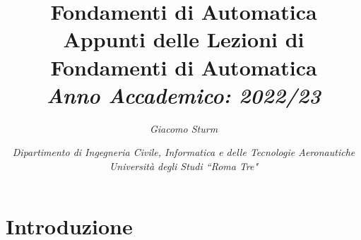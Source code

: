 \documentclass{article}
\numberwithin{equation}{subsection}
\begin{document}
\title{%
    \textbf{Fondamenti di Automatica}  \\ 
    \large Appunti delle Lezioni di Fondamenti di Automatica\\
    \textit{Anno Accademico: 2022/23}}
\author{\textit{Giacomo Sturm}}
\date{\textit{Dipartimento di Ingegneria Civile, Informatica e delle Tecnologie Aeronautiche \\
Università degli Studi ``Roma Tre"}}

\maketitle
\thispagestyle{link}

\clearpage


\pagestyle{fancy}
\fancyhead{}\fancyfoot{}
\fancyfoot[C]{\thepage}

\tableofcontents
\clearpage


\section{Introduzione}
\end{document}
